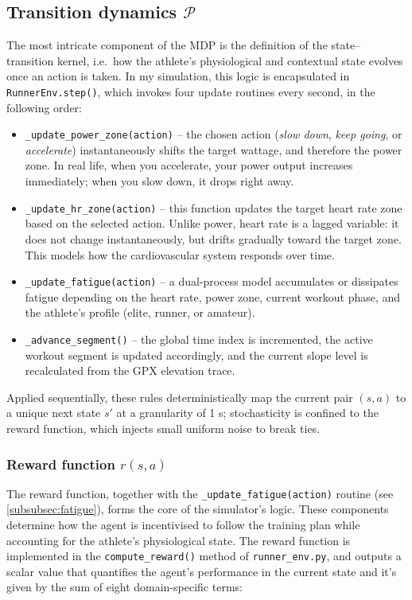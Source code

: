 \subsection{Transition dynamics \(\mathcal{P}\)}
The most intricate component of the MDP is the definition of the state–transition kernel, i.e.\ how the athlete's physiological and contextual state evolves once an action is taken. In my simulation, this logic is encapsulated in \verb|RunnerEnv.step()|, which invokes four update routines every second, in the following order:

\begin{itemize}
  \item \verb|_update_power_zone(action)| – the chosen action (\emph{slow down}, \emph{keep going}, or \emph{accelerate}) instantaneously shifts the target wattage, and therefore the power zone. In real life, when you accelerate, your power output increases immediately; when you slow down, it drops right away.
  
  \item \verb|_update_hr_zone(action)| – this function updates the target heart rate zone based on the selected action. Unlike power, heart rate is a lagged variable: it does not change instantaneously, but drifts gradually toward the target zone. This models how the cardiovascular system responds over time.

  \item \verb|_update_fatigue(action)| – a dual-process model accumulates or dissipates fatigue depending on the heart rate, power zone, current workout phase, and the athlete's profile (elite, runner, or amateur).

  \item \verb|_advance_segment()| – the global time index is incremented, the active workout segment is updated accordingly, and the current slope level is recalculated from the GPX elevation trace.
\end{itemize}


Applied sequentially, these rules deterministically map the current pair \((s,a)\) to a unique next state \(s'\) at a granularity of 1 s; stochasticity is confined to the reward function, which injects small uniform noise to break ties.

\subsubsection{Reward function \(r(s,a)\)}
The reward function, together with the \verb|_update_fatigue(action)| routine (see~ \ref{subsubsec:fatigue}), forms the core of the simulator’s logic. These components determine how the agent is incentivised to follow the training plan while accounting for the athlete’s physiological state. The reward function is implemented in the \verb|compute_reward()| method of \verb|runner_env.py|, and outputs a scalar value that quantifies the agent’s performance in the current state and it's given by the sum of eight domain-specific terms:

